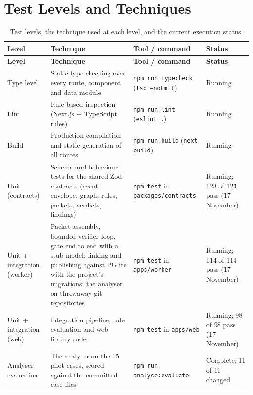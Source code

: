 \section{Test Levels and Techniques}
\label{sec:test-levels}

\begin{longtable}{>{\raggedright\arraybackslash}p{} >{\raggedright\arraybackslash}p{} >{\raggedright\arraybackslash}p{} >{\raggedright\arraybackslash}p{}}
\caption{Test levels, the technique used at each level, and the current execution status.}\label{tab:test-levels}\\
\hline\textbf{Level} & \textbf{Technique} & \textbf{Tool / command} &
  \textbf{Status} \\
\hline\endfirsthead
\hline\textbf{Level} & \textbf{Technique} & \textbf{Tool / command} &
  \textbf{Status} \\
\hline\endhead
Type level & Static type checking over every route, component and data module &
  \texttt{npm run typecheck} (\texttt{tsc --noEmit}) & Running \\
Lint & Rule-based inspection (Next.js + TypeScript rules) &
  \texttt{npm run lint} (\texttt{eslint .}) & Running \\
Build & Production compilation and static generation of all routes &
  \texttt{npm run build} (\texttt{next build}) & Running \\
Unit (contracts) & Schema and behaviour tests for the shared Zod contracts
  (event envelope, graph, rules, packets, verdicts, findings) &
  \texttt{npm test} in \texttt{packages/\allowbreak{}contracts} & Running; 123 of
  123 pass (17 November) \\
Unit + integration (worker) & Packet assembly, bounded verifier loop, gate
  end to end with a stub model; linking and publishing against PGlite with the
  project's migrations; the analyser on throwaway git repositories &
  \texttt{npm test} in \texttt{apps/\allowbreak{}worker} & Running; 114 of 114
  pass (17 November) \\
Unit + integration (web) & Integration pipeline, rule evaluation and web
  library code &
  \texttt{npm test} in \texttt{apps/\allowbreak{}web} & Running; 98 of 98 pass
  (17 November) \\
Analyser evaluation & The analyser on the 15 pilot cases, scored against the
  committed case files &
  \texttt{npm run analyse:\allowbreak{}evaluate} & Complete; 11 of 11 changed

\end{longtable}
